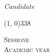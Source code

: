 \documentclass[../thesis.tex]{subfiles}
\begin{document}
\begin{titlepage}
\begin{center}
\begin{large}
                \vspace{0pt} 

                \begin{flushright}
                    \textit{Candidate}\\
                    \vspace{1pt}
                    \myName
                \end{flushright}
            \end{large}

            \vfill

            \line(1, 0){338} \\
            
            \begin{normalsize}
                \textsc{Sessione \mySession}\\
                \textsc{Academic year \myAY}
            \end{normalsize}

        \end{center}
    \end{titlepage}
\end{document}
